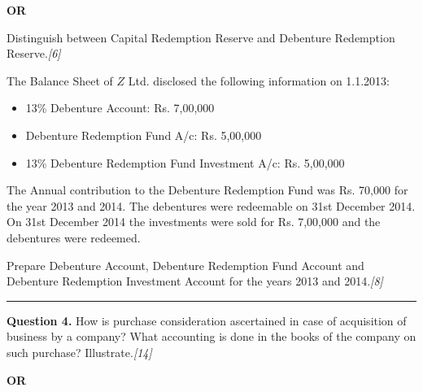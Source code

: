 \documentclass[11pt,a4paper]{article}
\newcommand{\pts}[1]{\hfill   \textit{[#1]}}
\begin{document}
\centerline{   \textbf{OR}}


\begin{parts}
  \item Distinguish between Capital Redemption Reserve and Debenture Redemption Reserve.\pts{6}
  \item The Balance Sheet of $Z$ Ltd. disclosed the following information on 1.1.2013:
  
\begin{itemize}[label=-,leftmargin=1.5cm]
    \item 13\% Debenture Account: Rs. 7,00,000
    \item Debenture Redemption Fund A/c: Rs. 5,00,000
    \item 13\% Debenture Redemption Fund Investment A/c: Rs. 5,00,000
  \end{itemize}
  The Annual contribution to the Debenture Redemption Fund was Rs. 70,000 for the year 2013 and 2014. The debentures were redeemable on 31st December 2014. On 31st December 2014 the investments were sold for Rs. 7,00,000 and the debentures were redeemed.
  
  Prepare Debenture Account, Debenture Redemption Fund Account and Debenture Redemption Investment Account for the years 2013 and 2014.\pts{8}
\end{parts}

\medskip\rule{\linewidth}{0.2pt}




\noindent   \textbf{Question 4.}
How is purchase consideration ascertained in case of acquisition of business by a company? What accounting is done in the books of the company on such purchase? Illustrate.\pts{14}

\centerline{   \textbf{OR}}
\end{document}
